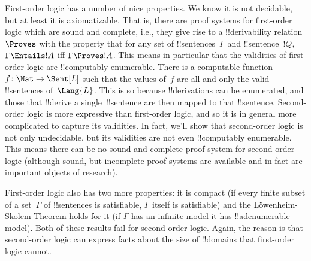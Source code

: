 \documentclass[../../../include/open-logic-section]{subfiles}
\begin{document}


First-order logic has a number of nice properties. We know it is not
decidable, but at least it is axiomatizable. That is, there are proof
systems for first-order logic which are sound and complete, i.e., they
give rise to a !!{derivability} relation~$\Proves$ with the property
that for any set of !!{sentence}s~$\Gamma$ and !!{sentence}~$!Q$,
$\Gamma \Entails !A$ iff $\Gamma \Proves !A$.  This means in
particular that the validities of first-order logic are !!{computably
  enumerable}. There is a computable function~$f\colon \Nat \to
\Sent[L]$ such that the values of~$f$ are all and only the valid
!!{sentence}s of~$\Lang{L}$. This is so because !!{derivation}s can be
enumerated, and those that !!{derive} a single~!!{sentence} are then
mapped to that !!{sentence}.  Second-order logic is more expressive
than first-order logic, and so it is in general more complicated to
capture its validities.  In fact, we'll show that second-order logic
is not only undecidable, but its validities are not even !!{computably
  enumerable}. This means there can be no sound and complete proof
system for second-order logic (although sound, but incomplete proof
systems are available and in fact are important objects of research).

First-order logic also has two more properties: it is compact (if
every finite subset of a set~$\Gamma$ of !!{sentence}s is satisfiable,
$\Gamma$ itself is satisfiable) and the L\"owenheim-Skolem Theorem
holds for it (if $\Gamma$ has an infinite model it has
!!a{denumerable} model). Both of these results fail for second-order
logic. Again, the reason is that second-order logic can express facts
about the size of !!{domain}s that first-order logic cannot.
\end{document}
